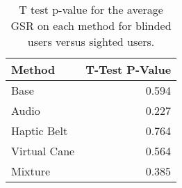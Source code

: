 
\begin{table}[!htb]
\centering
\caption{T test p-value for the average GSR on each method for blinded users versus sighted users.}
\label{tab:ttest_gsr_avg}
\begin{tabular}{lr}
\toprule
      Method &  T-Test P-Value \\
\midrule
        Base &           0.594 \\
       Audio &           0.227 \\
 Haptic Belt &           0.764 \\
Virtual Cane &           0.564 \\
     Mixture &           0.385 \\
\bottomrule
\end{tabular}
\end{table}


